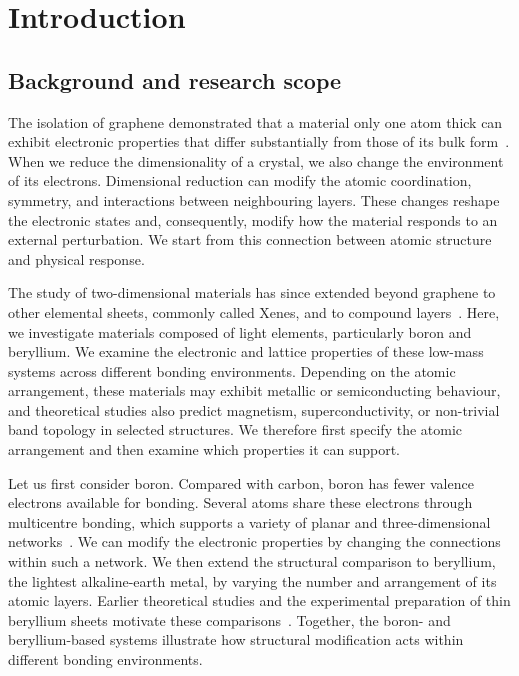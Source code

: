 \chapter{Introduction}
\label{cha:introduction}

\section{Background and research scope}
\label{sec:intro_background}

The isolation of graphene demonstrated that a material only one atom thick can exhibit electronic properties that differ substantially from those of its bulk form~\cite{novoselov2004electric,geim2007rise}.
When we reduce the dimensionality of a crystal, we also change the environment of its electrons.
Dimensional reduction can modify the atomic coordination, symmetry, and interactions between neighbouring layers.
These changes reshape the electronic states and, consequently, modify how the material responds to an external perturbation.
We start from this connection between atomic structure and physical response.

The study of two-dimensional materials has since extended beyond graphene to other elemental sheets, commonly called Xenes, and to compound layers~\cite{butler2013progress,molle2018silicene}.
Here, we investigate materials composed of light elements, particularly boron and beryllium.
We examine the electronic and lattice properties of these low-mass systems across different bonding environments.
Depending on the atomic arrangement, these materials may exhibit metallic or semiconducting behaviour, and theoretical studies also predict magnetism, superconductivity, or non-trivial band topology in selected structures.
We therefore first specify the atomic arrangement and then examine which properties it can support.

Let us first consider boron.
Compared with carbon, boron has fewer valence electrons available for bonding.
Several atoms share these electrons through multicentre bonding, which supports a variety of planar and three-dimensional networks~\cite{sun2017two,han2023superconducting}.
We can modify the electronic properties by changing the connections within such a network.
We then extend the structural comparison to beryllium, the lightest alkaline-earth metal, by varying the number and arrangement of its atomic layers.
Earlier theoretical studies and the experimental preparation of thin beryllium sheets motivate these comparisons~\cite{ono2020dynamical,chahal2023beryllene,li2023coexistence}.
Together, the boron- and beryllium-based systems illustrate how structural modification acts within different bonding environments.

